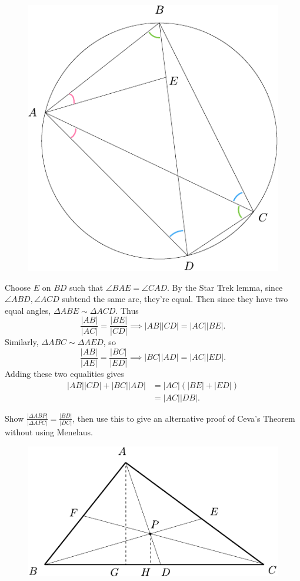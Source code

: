 \documentclass[twoside,10pt]{article}
\begin{document}
\begin{figure}[H]
        \centering
        \includegraphics[scale=1]{fig/151.pdf}
\end{figure}

Choose $E$ on $BD$ such that $\angle BAE = \angle CAD$. By the Star Trek lemma, since $\angle ABD, \angle ACD$ subtend the same arc, they're equal. Then since they have two equal angles, $\Delta ABE \sim \Delta ACD$. Thus
\[
\frac{|AB|}{|AC|} = \frac{|BE|}{|CD|} \implies |AB| |CD| = |AC| |BE|.
\] Similarly, $\Delta ABC \sim \Delta AED$, so
\[
\frac{|AB|}{|AE|} = \frac{|BC|}{|ED|} \implies |BC| |AD| = |AC| |ED|.
\] Adding these two equalities gives
\begin{align*}
        |AB| |CD| + |BC| |AD| &= |AC| (|BE| + |ED|) \\
                              &= |AC| |DB|.
\end{align*}

\newpage

\begin{exer}[1.165]
Show $\frac{|\Delta ABP|}{|\Delta APC|} = \frac{|BD|}{|DC|} $, then use this to give an alternative proof of Ceva's Theorem without using Menelaus.
\end{exer}

\begin{figure}[H]
	\centering
	\includegraphics[scale=1]{fig/165.pdf}
\end{figure}
\end{document}
